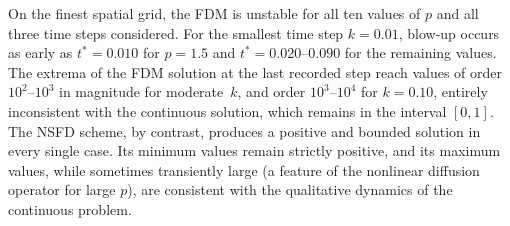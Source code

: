 \documentclass[final,12pt,3p]{elsarticle}
\theoremstyle{plain}
\theoremstyle{definition}
\theoremstyle{remark}
\begin{document}
On the finest spatial grid, the FDM is unstable for all ten values of $p$ and all three time steps considered.
For the smallest time step $k = 0.01$, blow-up occurs as early as $t^* = 0.010$ for $p = 1.5$ and $t^* = 0.020$--$0.090$ for the remaining values.
The extrema of the FDM solution at the last recorded step reach values of order $10^2$--$10^3$ in magnitude for moderate~$k$, and order $10^3$--$10^4$ for $k = 0.10$, entirely inconsistent with the continuous solution, which remains in the interval $[0,1]$.
The NSFD scheme, by contrast, produces a positive and bounded solution in every single case.
Its minimum values remain strictly positive, and its maximum values, while sometimes transiently large (a feature of the nonlinear diffusion operator for large $p$), are consistent with the qualitative dynamics of the continuous problem.
\end{document}
